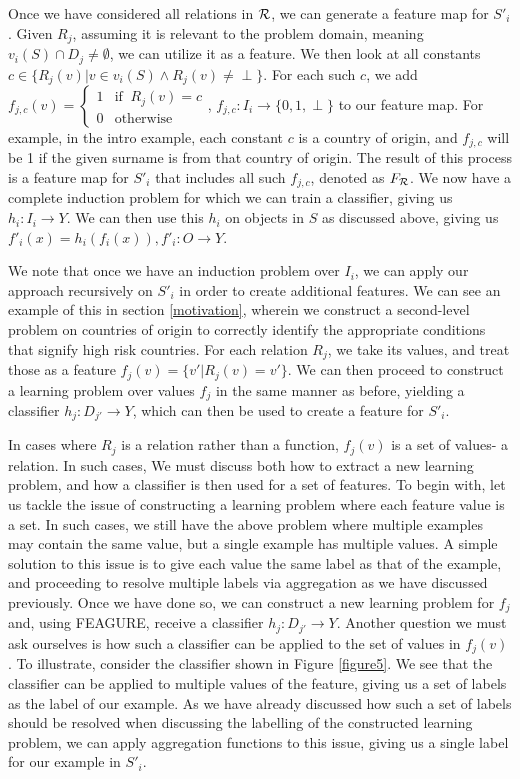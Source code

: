 \documentclass[twoside,11pt]{article}
\theoremstyle{definition}
\begin{document}
Once we have considered all relations in ${\cal R}$, we can generate a feature map for $S'_i$. Given $R_j$, assuming it is relevant to the problem domain, meaning $v_i(S)\cap D_j\neq\emptyset$, we can utilize it as a feature. We then look at all constants $c\in \{R_j(v)|v\in v_i(S)\land R_j(v)\neq \perp\}$. For each such $c$, we add  $f_{j,c}(v)=\begin{cases} 1 &\mbox{if } \ R_j(v)=c\\ 
0 & \mbox{otherwise } \end{cases}$, $f_{j,c}:I_i\rightarrow \{0,1,\perp\}$ to our feature map. 
For example, in the intro example, each constant $c$ is a country of origin, and $f_{j,c}$ will be 1 if the given surname is from that country of origin.
The result of this process is a feature map for $S'_i$ that includes all such $f_{j,c}$, denoted as $F_{\cal R}$. We now have a complete induction problem for which we can train a classifier, giving us $h_i:I_i\rightarrow Y$. We can then use this $h_i$ on objects in $S$ as discussed above, giving us $f'_{i}(x)=h_{i}(f_{i}(x)), f'_{i}:O\rightarrow Y$. 

We note that once we have an induction problem over $I_i$, we can apply our approach recursively on $S'_i$ in order to create additional features. We can see an example of this in section \ref{motivation}, wherein we construct a second-level problem on countries of origin to correctly identify the appropriate conditions that signify high risk countries.
 For each relation $R_j$, we take its values, and treat those as a feature $f_j(v)=\{v'|R_j(v)=v' \}$. We can then proceed to construct a learning problem over values $f_j$ in the same manner as before, yielding a classifier $h_j:D_{j'}\rightarrow Y$, which can then be used to create a feature for $S'_i$. 
 
 In cases where $R_j$ is a relation rather than a function, $f_j(v)$ is a set of values- a relation. In such cases, We must discuss both how to extract a new learning problem, and how a classifier is then used for a set of features.
 To begin with, let us tackle the issue of constructing a learning problem where each feature value is a set. In such cases, we still have the above problem where multiple examples may contain the same value, but a single example has multiple values. A simple solution to this issue is to give each value the same label as that of the example, and proceeding to resolve multiple labels via aggregation as we have discussed previously. 
 Once we have done so, we can construct a new learning problem for $f_j$ and, using FEAGURE, receive a classifier $h_j:D_{j'}\rightarrow Y$.
 Another question we must ask ourselves is how such a classifier can be applied to the set of values in $f_j(v)$. To illustrate, consider the classifier shown in Figure \ref{figure5}. We see that the classifier can be applied to multiple values of the feature, giving us a set of labels as the label of our example. As we have already discussed how such a set of labels should be resolved when discussing the labelling of the constructed learning problem, we can apply aggregation functions to this issue, giving us a single label for our example in $S'_i$.
\end{document}
